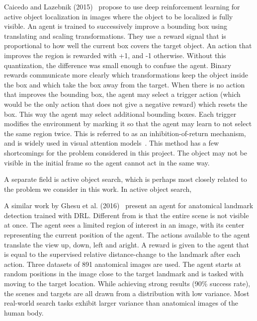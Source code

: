 Caicedo and Lazebnik (2015)~\cite{caicedo_active_2015} propose to use deep reinforcement learning for active object localization in images where the object to be localized is fully visible.
An agent is trained to successively improve a bounding box using translating and scaling transformations.
They use a reward signal that is proportional to how well the current box covers the target object.
An action that improves the region is rewarded with +1, and -1 otherwise.
Without this quantization, the difference was small enough to confuse the agent.
Binary rewards communicate more clearly which transformations keep the object inside the box and which take the box away from the target.
When there is no action that improves the bounding box, the agent may select a trigger action (which would be the only action that does not give a negative reward) which resets the box.
This way the agent may select additional bounding boxes.
Each trigger modifies the environment by marking it so that the agent may learn to not select the same region twice.
This is referred to as an inhibition-of-return mechanism, and is widely used in visual attention models~\cite{[16] in caicedo_active_2015}.
This method has a few shortcomings for the problem considered in this project.
The object may not be visible in the initial frame so the agent cannot act in the same way. 

A separate field is active object search, which is perhaps most closely related to the problem we consider in this work.
In active object search, %


% 

A similar work by Ghesu et al. (2016)~\cite{ghesu_artificial_2016} present an agent for anatomical landmark detection trained with DRL.
Different from \cite{caicedo_active_2015} is that the entire scene is not visible at once.
The agent sees a limited region of interest in an image, with its center representing the current position of the agent.
The actions available to the agent translate the view up, down, left and aright.
A reward is given to the agent that is equal to the supervised relative distance-change to the landmark after each action.
Three datasets of 891 anatomical images are used.
The agent starts at random positions in the image close to the target landmark and is tasked with moving to the target location.
While achieving strong results (90\% success rate), the scenes and targets are all drawn from a distribution with low variance.
Most real-world search tasks exhibit larger variance than anatomical images of the human body.

